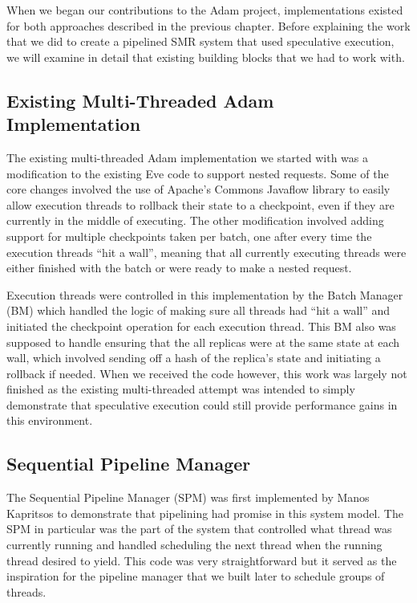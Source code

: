 \documentclass[11pt, oneside]{report}
\begin{document}
When we began our contributions to the Adam project, implementations existed for both approaches described in the previous chapter. Before explaining the work that we did to create a pipelined SMR system that used speculative execution, we will examine in detail that existing building blocks that we had to work with.

\subsection{Existing Multi-Threaded Adam Implementation}

The existing multi-threaded Adam implementation we started with was a modification to the existing Eve code to support nested requests. Some of the core changes involved the use of Apache's Commons Javaflow library to easily allow execution threads to rollback their state to a checkpoint, even if they are currently in the middle of executing. The other modification involved adding support for multiple checkpoints taken per batch, one after every time the execution threads ``hit a wall'', meaning that all currently executing threads were either finished with the batch or were ready to make a nested request.

Execution threads were controlled in this implementation by the Batch Manager (BM) which handled the logic of making sure all threads had ``hit a wall'' and initiated the checkpoint operation for each execution thread. This BM also was supposed to handle ensuring that the all replicas were at the same state at each wall, which involved sending off a hash of the replica's state and initiating a rollback if needed. When we received the code however, this work was largely not finished as the existing multi-threaded attempt was intended to simply demonstrate that speculative execution could still provide performance gains in this environment.

\subsection{Sequential Pipeline Manager}

The Sequential Pipeline Manager (SPM) was first implemented by Manos Kapritsos to demonstrate that pipelining had promise in this system model. The SPM in particular was the part of the system that controlled what thread was currently running and handled scheduling the next thread when the running thread desired to yield. This code was very straightforward but it served as the inspiration for the pipeline manager that we built later to schedule groups of threads.
\end{document}
